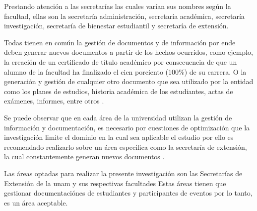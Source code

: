 Prestando atención a las  secretarías las cuales varían sus nombres según la facultad, ellas son  la secretaría administración, 
secretaría académica, secretaría investigación, secretaría de bienestar estudiantil y secretaría de extensión.   

Todas  tienen en común  la gestión de  documentos y de información por ende deben generar nuevos documentos a partir de los 
hechos ocurridos, como ejemplo, la creación de un certificado de título académico por consecuencia de que un alumno de la facultad
ha finalizado el cien porciento (100\%) de su carrera. O la generación y gestión de cualquier otro documento que sea utilizado por 
la entidad como los planes de estudios, historia académica de los estudiantes, actas de exámenes, informes, entre otros \cite[]{estatuto,larraburu_secretariextension_2020}. 

Se puede observar que en cada área de la universidad utilizan la gestión de información y documentación, es necesario por cuestiones 
de optimización que la investigación limite el dominio en la cual sea aplicable el estudio por ello es recomendado realizarlo sobre un 
área especifica como la secretaría de extensión, la cual constantemente generan nuevos documentos \cite[]{larraburu_secretariextension_2020}.


Las áreas optadas para realizar la presente investigación son las Secretarías de Extensión de la \gls{unam} y sus respectivas facultades 
Estas áreas tienen que gestionar documentaciónes de estudiantes y participantes de eventos por lo tanto, es un área aceptable.



